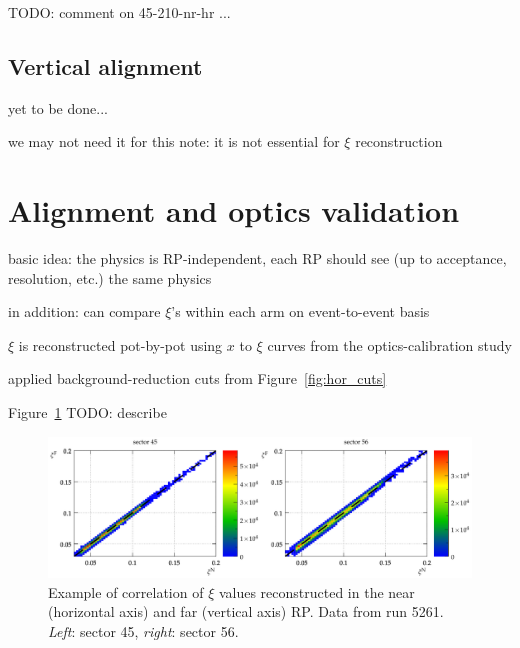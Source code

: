 \documentclass[TOTEM]{cern/cernphprep}
\def\TODO#1{{\color{red}TODO: #1}}
\def\hang{\hangindent=\parindent}
\def\>{\par\vskip\itskip\parindent\itindent\indent\hang\llap{\hbox to3mm{$\bullet$\hss}}}
\def\>E{\par\vskip\itskip\parindent\itindent\indent\hang\llap{\hbox to3mm{\hss}}}
\def\>>{\par\vskip\iitskip\parindent\iitindent\indent\hang\llap{\hbox to\iitindent{\hss--\ }}}
\begin{document}
\> \TODO{comment on 45-210-nr-hr ...}


\subsection{Vertical alignment}
\label{s:phys-vertical}

\> yet to be done...

\> we may not need it for this note: it is not essential for $\xi$ reconstruction


\section{Alignment and optics validation}
\label{s:val}

\> basic idea: the physics is RP-independent, each RP should see (up to acceptance, resolution, etc.) the same physics

\> in addition: can compare $\xi$'s within each arm on event-to-event basis


\> $\xi$ is reconstructed pot-by-pot using $x$ to $\xi$ curves from the optics-calibration study \cite{optics_calibration}


\> applied background-reduction cuts from Figure~\ref{fig:hor_cuts}

\> Figure~\ref{fig:xi_NF_cmp} \TODO{describe}


\begin{figure}[h!]
\begin{center}
\includegraphics[width=\hsize]{fig/validation/xi_NF_corr_cmp.pdf}
\caption{%
Example of correlation of $\xi$ values reconstructed in the near (horizontal axis) and far (vertical axis) RP. Data from run 5261. {\it Left}: sector 45, {\it right}: sector 56.
}
\label{fig:xi_NF_cmp}
\end{center}
\end{figure}
\end{document}
